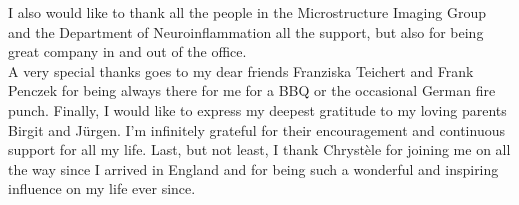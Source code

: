 \noindent
I also would like to thank all the people in the Microstructure Imaging Group and the Department of Neuroinflammation all the support, but also for being great company in and out of the office. \\

\noindent
A very special thanks goes to my dear friends Franziska Teichert and Frank Penczek for being always there for me for a BBQ or the occasional German fire punch. 
Finally, I would like to express my deepest gratitude to my loving parents Birgit and J\"urgen. I'm infinitely grateful for their encouragement and continuous support for all my life. Last, but not least, I thank Chrystèle for joining me on all the way since I arrived in England and for being such a wonderful and inspiring influence on my life ever since.

\endgroup